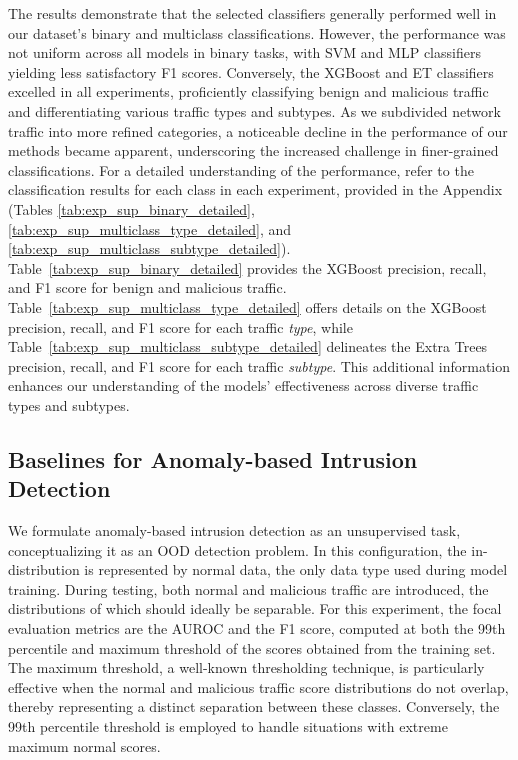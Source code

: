 \documentclass[lettersize,journal]{IEEEtran}
\begin{document}
The results demonstrate that the selected classifiers generally performed well in our dataset's binary and multiclass classifications. However, the performance was not uniform across all models in binary tasks, with \ac{SVM} and \ac{MLP} classifiers yielding less satisfactory F1 scores. Conversely, the \ac{XGBoost} and \ac{ET} classifiers excelled in all experiments, proficiently classifying benign and malicious traffic and differentiating various traffic types and subtypes. As we subdivided network traffic into more refined categories, a noticeable decline in the performance of our methods became apparent, underscoring the increased challenge in finer-grained classifications. For a detailed understanding of the performance, refer to the classification results for each class in each experiment, provided in the Appendix (Tables \ref{tab:exp_sup_binary_detailed}, \ref{tab:exp_sup_multiclass_type_detailed}, and \ref{tab:exp_sup_multiclass_subtype_detailed}). Table~\ref{tab:exp_sup_binary_detailed} provides the XGBoost precision, recall, and F1 score for benign and malicious traffic. Table~\ref{tab:exp_sup_multiclass_type_detailed} offers details on the XGBoost precision, recall, and F1 score for each traffic \textit{type}, while Table~\ref{tab:exp_sup_multiclass_subtype_detailed} delineates the Extra Trees precision, recall, and F1 score for each traffic \textit{subtype}. This additional information enhances our understanding of the models' effectiveness across diverse traffic types and subtypes.

\subsection{Baselines for Anomaly-based Intrusion Detection} \label{sec:unsupervised}
We formulate anomaly-based intrusion detection as an unsupervised task, conceptualizing it as an \ac{OOD} detection problem. In this configuration, the in-distribution is represented by normal data, the only data type used during model training. During testing, both normal and malicious traffic are introduced, the distributions of which should ideally be separable. For this experiment, the focal evaluation metrics are the \ac{AUROC} and the F1 score, computed at both the 99th percentile and maximum threshold of the scores obtained from the training set. The maximum threshold, a well-known thresholding technique, is particularly effective when the normal and malicious traffic score distributions do not overlap, thereby representing a distinct separation between these classes. Conversely, the 99th percentile threshold is employed to handle situations with extreme maximum normal scores.
\end{document}
